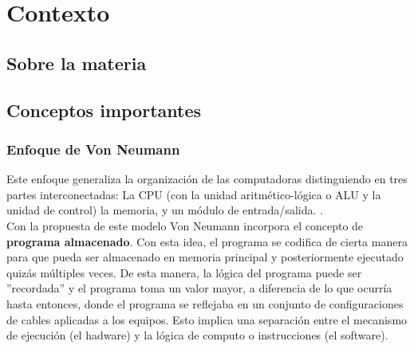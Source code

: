 \chapter{Contexto}
\section{Sobre la materia \orga}
\section{Conceptos importantes}

\subsection{Enfoque de Von Neumann}
Este enfoque generaliza la organización de las computadoras distinguiendo en tres partes interconectadas: La CPU (con la unidad aritmético-lógica o ALU y la unidad de control) la memoria, y un módulo de entrada/salida. . \\

Con la propuesta de este modelo Von Neumann incorpora el concepto de \textbf{programa almacenado}. 
{Con esta idea, el programa se codifica de cierta manera para que pueda ser almacenado en memoria principal y posteriormente ejecutado quizás múltiples veces. De esta manera, la lógica del programa puede ser ''recordada'' y el programa toma un valor mayor, a diferencia de lo que ocurría hasta entonces, donde el programa se reflejaba en un conjunto de configuraciones de cables aplicadas a los equipos. Esto implica una separación entre el mecanismo de ejecución (el hadware) y la lógica de computo o instrucciones (el software).}

